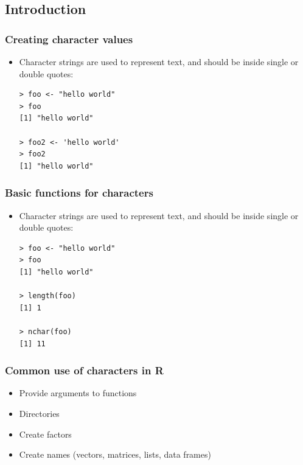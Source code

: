 \documentclass[xcolor=dvipsnames, xcolor=table]{beamer} %
\theoremstyle{mystyle}
\begin{document}
\subsection{Introduction}

\begin{frame}[fragile] %
\frametitle{Creating character values}

\begin{itemize}
\item Character strings are used to represent text, and should be inside single or double quotes:

\begin{verbatim}
> foo <- "hello world"
> foo
[1] "hello world"

> foo2 <- 'hello world'
> foo2
[1] "hello world"

\end{verbatim}
\end{itemize}
\end{frame}

\begin{frame}[fragile] %
\frametitle{Basic functions for characters}

\begin{itemize}
\item Character strings are used to represent text, and should be inside single or double quotes:

\begin{verbatim}
> foo <- "hello world"
> foo
[1] "hello world"

> length(foo)
[1] 1

> nchar(foo)
[1] 11
\end{verbatim}
\end{itemize}
\end{frame}

\begin{frame}
\frametitle{Common use of characters in R}

\begin{itemize}
\item Provide arguments to functions
\item Directories
\item Create factors
\item Create names (vectors, matrices, lists, data frames)
\end{itemize}
\end{frame}
\end{document}
